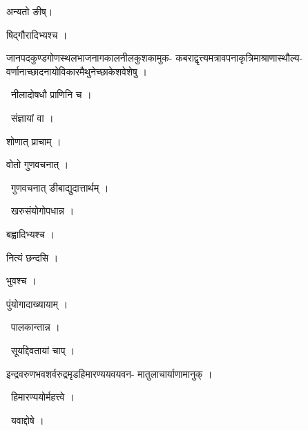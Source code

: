 \documentclass[10pt, openany, oneside]{book}
\begin{document}
\noindent अन्यतो ङीष्।

\noindent षिद्गौरादिभ्यश्च ।

\noindent जानपदकुण्डगोणस्थलभाजनागकालनीलकुशकामुक- कबराद्वृत्त्यमत्रावपनाकृत्रिमाश्राणास्थौल्य- वर्णानाच्छादनायोविकारमैथुनेच्छाकेशवेशेषु ।

\par\noindent\hspace{1.5em}{\vps वा॰}~{\qt नीलादोषधौ प्राणिनि च ।}

\par\noindent\hspace{1.5em}{\vps वा॰}~{\qt संज्ञायां वा ।}

\noindent शोणात् प्राचाम् ।

\noindent वोतो गुणवचनात् ।

\par\noindent\hspace{1.5em}{\vps वा॰}~{\qt गुणवचनात् ङीबाद्युदात्तार्थम् ।}

\par\noindent\hspace{1.5em}{\vps वा॰}~{\qt खरुसंयोगोपधान्न ।}

\noindent बह्वादिभ्यश्च ।

\noindent नित्यं छन्दसि ।

\noindent भुवश्च ।

\noindent पुंयोगादाख्यायाम् ।

\par\noindent\hspace{1.5em}{\vps वा॰}~{\qt पालकान्तान्न ।}

\par\noindent\hspace{1.5em}{\vps वा॰}~{\qt सूर्याद्देवतायां चाप् ।}

\noindent इन्द्रवरुणभवशर्वरुद्रमृडहिमारण्ययवयवन- मातुलाचार्याणामानुक् ।

\par\noindent\hspace{1.5em}{\vps वा॰}~{\qt हिमारण्ययोर्महत्त्वे ।}

\par\noindent\hspace{1.5em}{\vps वा॰}~{\qt यवाद्दोषे ।}
\end{document}
